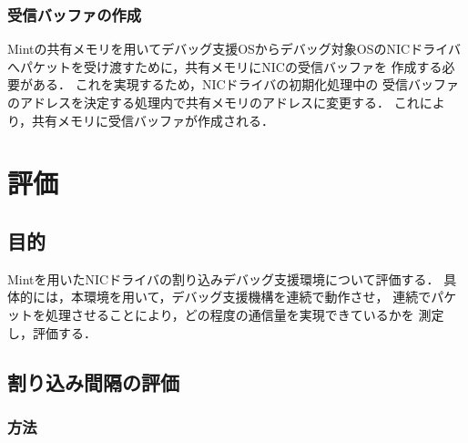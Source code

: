 \documentclass[submit,techreq,noauthor,dvipdfmx]{ipsj}
\begin{document}
\subsubsection{受信バッファの作成}\label{sec:creating_recieving_buffer}

Mintの共有メモリを用いてデバッグ支援OSからデバッグ対象OSのNICドライバ
へパケットを受け渡すために，共有メモリにNICの受信バッファを
作成する必要がある．
これを実現するため，NICドライバの初期化処理中の
受信バッファのアドレスを決定する処理内で共有メモリのアドレスに変更する．
これにより，共有メモリに受信バッファが作成される．

\section{評価}\label{chap:evaluation}

\subsection{目的}\label{sec:purpose_of_evaluation}

Mintを用いたNICドライバの割り込みデバッグ支援環境について評価する．
具体的には，本環境を用いて，デバッグ支援機構を連続で動作させ，
連続でパケットを処理させることにより，どの程度の通信量を実現できているかを
測定し，評価する．

\subsection{割り込み間隔の評価}\label{sec:evaluation_of_interrupt_interval}

\subsubsection{方法}\label{sec:method_of_evaluation}
\end{document}
